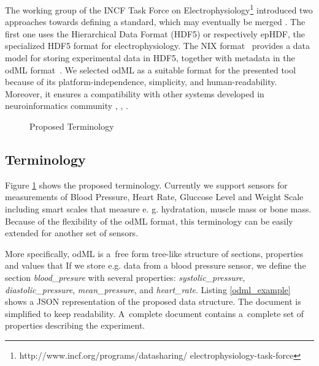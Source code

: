 \documentclass[a4paper,twoside]{article}
\begin{document}
The working group of the INCF Task Force on Electrophysiology\footnote{http://www.incf.org/programs/datasharing/ electrophysiology-task-force} introduced two approaches towards defining a standard, which may eventually be merged \cite{10.3389/conf.fninf.2013.09.00069}. The first one uses the Hierarchical Data Format (HDF5) \cite{hdf5} or respectively epHDF, the  specialized HDF5 format for electrophysiology. The NIX format~\cite{Stoewer:2014} provides a data model for storing experimental data in HDF5, together with metadata in the odML format~\cite{10.3389/fninf.2011.00016}. We selected odML as a suitable format for the presented tool because of its platform-independence, simplicity, and human-readability. Moreover, it ensures a compatibility with other systems developed in neuroinformatics community \cite{10.3389/conf.fninf.2014.18.00029}, \cite{10.3389/conf.fninf.2014.18.00053}, \cite{10.3389/conf.fninf.2013.09.00025}.

\begin{figure}

  \centering
   {}
  \caption{Proposed Terminology}
  \label{fig:Terminology}
 \end{figure}


\subsection{Terminology}

Figure \ref{fig:Terminology} shows the proposed terminology. Currently we support sensors for measurements of Blood Pressure, Heart Rate, Gluccose Level and Weight Scale including smart scales that measure e. g. hydratation, muscle mass or bone mass. Because of the flexibility of the odML format, this terminology can be easily extended for another set of sensors.


More specifically, odML is a~free form tree-like structure of sections, properties and values that  If we store e.g. data from a blood pressure sensor, we define the section \emph{blood\_presure} with several properties: \textit{systolic\_pressure}, \textit{diastolic\_pressure}, \textit{mean\_pressure}, and \textit{heart\_rate}. Listing \ref{odml_example} shows a JSON representation of the proposed data structure. The document is simplified to keep readability. A~complete document contains a~complete set of properties describing the experiment.
\end{document}
